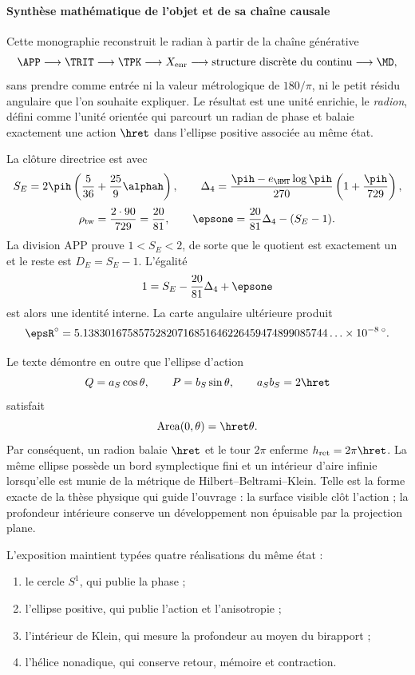 \paragraph{Synthèse mathématique de l'objet et de sa chaîne causale}

Cette monographie reconstruit le radian à partir de la chaîne générative
\[
\APP\longrightarrow\TRIT\longrightarrow\TPK
\longrightarrow X_{\mathrm{enr}}
\longrightarrow\text{structure discrète du continu}
\longrightarrow\MD,
\]
sans prendre comme entrée ni la valeur métrologique de \(180/\pi\), ni le petit
résidu angulaire que l'on souhaite expliquer. Le résultat est une unité enrichie,
le \emph{radion}, défini comme l'unité orientée qui parcourt un radian de
phase et balaie exactement une action \(\hret\) dans l'ellipse positive associée
au même état.

La clôture directrice est
\BigRadionEquation
avec
\[
S_E=2\pih\left(\frac5{36}+\frac{25}{9}\alphah\right),
\qquad
\Delta_4=
\frac{\pih-e_{\HMT}\log\pih}{270}
\left(1+\frac{\pih}{729}\right),
\]
\[
\rho_{\mathrm{tw}}=\frac{2\cdot90}{729}=\frac{20}{81},
\qquad
\epsone=\frac{20}{81}\Delta_4-(S_E-1).
\]
La division APP prouve \(1<S_E<2\), de sorte que le quotient est exactement
un et le reste est \(D_E=S_E-1\). L'égalité
\[
1=S_E-\frac{20}{81}\Delta_4+\epsone
\]
est alors une identité interne. La carte angulaire ultérieure produit
\[
\epsR^\circ
=5.13830167585752820716851646226459474899085744\ldots
\times10^{-8}\,{}^\circ.
\]

Le texte démontre en outre que l'ellipse d'action
\[
Q=a_S\cos\theta,\qquad P=b_S\sin\theta,\qquad
a_Sb_S=2\hret
\]
satisfait
\[
\operatorname{Area}(0,\theta)=\hret\theta.
\]
Par conséquent, un radion balaie \(\hret\) et le tour \(2\pi\) enferme
\(h_{\mathrm{ret}}=2\pi\hret\). La même ellipse possède un bord symplectique
fini et un intérieur d'aire infinie lorsqu'elle est munie de la métrique
de Hilbert--Beltrami--Klein. Telle est la forme exacte de la thèse physique qui guide
l'ouvrage : la surface visible clôt l'action ; la profondeur intérieure
conserve un développement non épuisable par la projection plane.

L'exposition maintient typées quatre réalisations du même état :

\begin{enumerate}[label=\textbf{\arabic*.}]
\item le cercle \(S^1\), qui publie la phase ;
\item l'ellipse positive, qui publie l'action et l'anisotropie ;
\item l'intérieur de Klein, qui mesure la profondeur au moyen du birapport ;
\item l'hélice nonadique, qui conserve retour, mémoire et contraction.
\end{enumerate}

